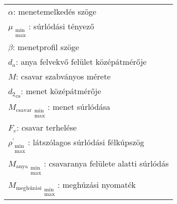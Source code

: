 \begin{center}
	\begin{tabular}{l}
		$\alpha$: menetemelkedés szöge \siunit{}{\degree} \\
		$\mu_{\substack{\text{min}\\\text{max}}}$: súrlódási tényező \siunit{}{-} \\
		$\beta$: menetprofil szöge \siunit{}{\degree} \\
		$d_a$: anya felvekvő felület középátmérője \siunit{}{\mm} \\
		$M$: csavar szabványos mérete \siunit{}{\mm} \\
		${d_2}_\text{cs}$: menet középátmérője \siunit{}{\mm} \\
		${M_\text{csavar}}_{\substack{\text{min}\\\text{max}}}$: menet súrlódása \siunit{}{\newton\mm} \\
		$F_v$: csavar terhelése \siunit{}{\newton} \\
		$\rho^{'}_{\substack{\text{min}\\\text{max}}}$: látszólagos súrlódási félkúpszög \siunit{}{\degree} \\
		${M_\text{anya}}_{\substack{\text{min}\\\text{max}}}$: csavaranya felülete alatti súrlódás \siunit{}{\newton\mm} \\
		${M_\text{meghúzási}}_{\substack{\text{min}\\\text{max}}}$: meghúzási nyomaték \siunit{}{\newton\mm} \\
	\end{tabular}
\end{center}
